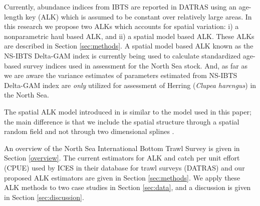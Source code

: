 \documentclass[a4paper 12pt]{article}
\numberwithin{equation}{section}
\begin{document}
Currently, abundance indices from IBTS are reported in DATRAS \citep{datras} using an age-length key (ALK) \citep{fridriksson1934calculation} which is assumed to be constant over relatively large areas. In this research we propose two ALKs which accounts for spatial variation: i) a nonparametric  haul based ALK, and ii) a spatial model based ALK. These ALKs are described in Section \ref{sec:methods}. %
A spatial model based ALK \citep{berg2012spatial, berg2014evaluation} known as the NS-IBTS Delta-GAM index \citep{ICES2016b} is currently being used to calculate standardized age-based survey indices used in assessment for the North Sea stock. And, as far as we are aware the variance estimates of parameters estimated from NS-IBTS Delta-GAM index  are \textit{only} utilized for assessment of Herring (\textit{Clupea harengus}) in the North Sea.

The spatial ALK model introduced in \citet{berg2012spatial} is similar to the model used in this paper; the main difference is that we include the spatial structure through a spatial random field \citep{lindgren2011explicit} and not through two dimensional splines \citep{wood2017generalized}.

 An  overview of the  North Sea International Bottom Trawl Survey is given in Section \ref{overview}. The current estimators for ALK and catch per unit effort (CPUE) used by ICES in their database for trawl surveys (DATRAS) and our proposed ALK estimators are given in Section \ref{sec:methods}. We apply these ALK methods to two case studies in Section  \ref{sec:data}, and a discussion is given in Section \ref{sec:discussion}.
\end{document}
